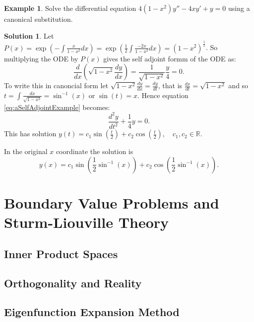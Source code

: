 \documentclass{article}
\theoremstyle{plain}
\theoremstyle{definition}
\newtheorem{exmp}{Example}[section]
\newtheorem*{sol}{Solution}
\numberwithin{equation}{section}
\begin{document}
\begin{tcolorbox}
    \begin{exmp}
        Solve the differential equation $4(1-x^2)y'' - 4xy' + y = 0$ using a canonical substitution.
    \end{exmp}
    \begin{sol}
        Let $P(x) = \exp\left(-\int\frac{x}{1-x^2} dx\right) = \exp\left( \frac{1}{2} \int \frac{-2x}{1-x^2} dx \right) = (1-x^2)^{\frac{1}{2}}$.
        So multiplying the ODE by $P(x)$ gives the self adjoint formm of the ODE as:\
        \begin{equation}\label{eq:aSelfAdjointExample}
            \frac{d}{dx}\left( \sqrt{1-x^2} \frac{dy}{dx} \right) = \frac{1}{\sqrt{1-x^2}}\frac{y}{4} = 0.
        \end{equation}
        To write this in canoncial form let $\sqrt{1-x^2}\frac{dy}{dx} = \frac{dy}{dt}$, that is $\frac{dx}{dt} = \sqrt{1-x^2}$ and so $t=\int \frac{dx}{\sqrt{1-x^2}} = \sin^{-1}(x)$ or $\sin(t) = x$. Hence equation \eqref{eq:aSelfAdjointExample} becomes:
        \[\frac{d^2y}{dt^2} + \frac{1}{4}y = 0.\]
        This has solution $y(t) = c_1\sin\left(\frac{t}{2}\right) + c_2 \cos \left( \frac{t}{2} \right), \quad c_1,c_2 \in \mathbb{R}$.

        In the original $x$ coordinate the solution is
        \[ y(x) = c_1\sin \left(\frac{1}{2} \sin^{-1}(x) \right) + c_2 \cos\left(\frac{1}{2}\sin^{-1}(x)\right). \]
    \end{sol}
\end{tcolorbox}

\pagebreak
\section{Boundary Value Problems and Sturm-Liouville Theory}

\subsection{Inner Product Spaces}

\subsection{Orthogonality and Reality}

\subsection{Eigenfunction Expansion Method}
\end{document}
